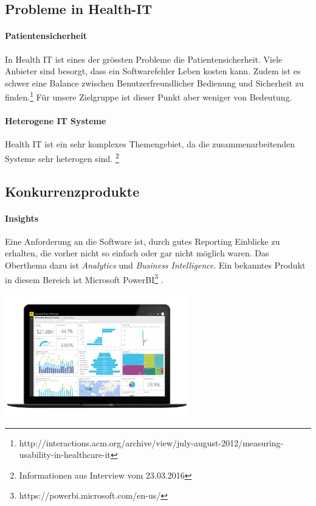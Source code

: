 \documentclass[a4paper]{scrreprt}
\begin{document}
\subsection{Probleme in Health-IT}
\paragraph{Patientensicherheit} In Health IT ist eines der grössten Probleme die Patientensicherheit. Viele Anbieter sind besorgt, dass ein Softwarefehler Leben kosten kann. Zudem ist es schwer eine Balance zwischen Benutzerfreundlicher Bedienung und Sicherheit zu finden.\footnote{http://interactions.acm.org/archive/view/july-august-2012/measuring-usability-in-healthcare-it}
Für unsere Zielgruppe ist dieser Punkt aber weniger von Bedeutung.

\paragraph{Heterogene IT Systeme} Health IT ist ein sehr komplexes Themengebiet, da die zusammenarbeitenden Systeme sehr heterogen sind. \footnote{Informationen aus Interview vom 23.03.2016}



\subsection{Konkurrenzprodukte}
\paragraph{Insights} Eine Anforderung an die Software ist, durch gutes Reporting Einblicke zu erhalten, die vorher nicht so einfach oder gar nicht möglich waren. Das Oberthema dazu ist \textit{Analytics} und \textit{Business Intelligence}. Ein bekanntes Produkt in diesem Bereich ist Microsoft PowerBI\footnote{https://powerbi.microsoft.com/en-us/} .

\includegraphics[width=0.6\textwidth]{img/research_ms-powerbi.png}
\end{document}
